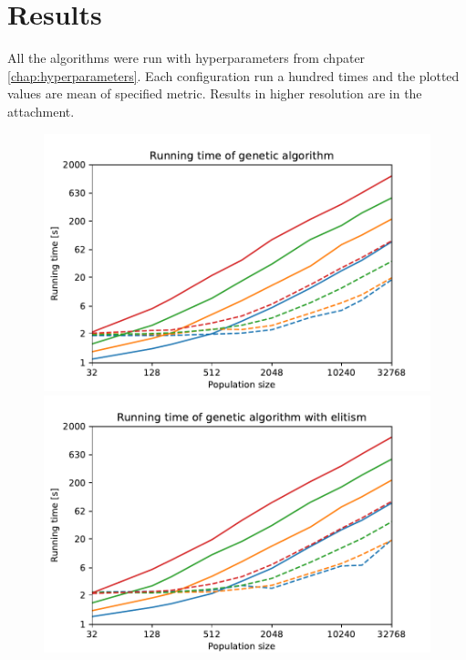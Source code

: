 \chapter{Results}
\label{chap:results}

All the algorithms were run with hyperparameters from chpater \ref{chap:hyperparameters}. Each configuration run a hundred times and the plotted values are mean of specified metric. Results in higher resolution are in the attachment.



\begin{figure}[ht!]
    \centering
    \begin{minipage}[t]{0.9\textwidth}
        \begin{minipage}[t]{0.48\textwidth}
            \includegraphics[width=\textwidth]{img/runs/time_ga.pdf}
        \end{minipage}
        \begin{minipage}[t]{0.48\textwidth}
            \includegraphics[width=\textwidth]{img/runs/time_ga_elitism.pdf}
        \end{minipage}
    \end{minipage}


\end{figure}
